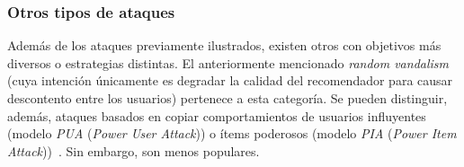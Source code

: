 \subsubsection{Otros tipos de ataques}

Además de los ataques previamente ilustrados, existen otros con objetivos más diversos o estrategias distintas. El anteriormente mencionado \textit{random vandalism} (cuya intención únicamente es degradar la calidad del recomendador para causar descontento entre los usuarios) pertenece a esta categoría. Se pueden distinguir, además, ataques basados en copiar comportamientos de usuarios influyentes (modelo \textit{PUA} (\textit{Power User Attack})) o ítems poderosos (modelo \textit{PIA} (\textit{Power Item Attack}))~\cite{mingdan2018ShillingAttacksAReview}. Sin embargo, son menos populares.


